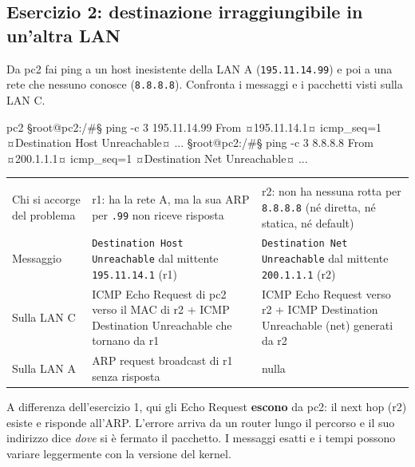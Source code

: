 \subsection{Esercizio 2: destinazione irraggiungibile in un'altra LAN}
\begin{esempio}[Consegna]
Da pc2 fai ping a un host inesistente della LAN A (\texttt{195.11.14.99}) e poi a una rete che nessuno conosce (\texttt{8.8.8.8}). Confronta i messaggi e i pacchetti visti sulla LAN C.
\end{esempio}
\begin{terminale}{pc2}
§root@pc2:/#§ ping -c 3 195.11.14.99
From ¤195.11.14.1¤ icmp_seq=1 ¤Destination Host Unreachable¤
...
§root@pc2:/#§ ping -c 3 8.8.8.8
From ¤200.1.1.1¤ icmp_seq=1 ¤Destination Net Unreachable¤
...
\end{terminale}
\begin{tecnica}[Soluzione]
\begin{center}
\begin{tabularx}{\linewidth}{l Y Y}
 &  & \\
Chi si accorge del problema & r1: ha la rete A, ma la sua ARP per \texttt{.99} non riceve risposta & r2: non ha nessuna rotta per \texttt{8.8.8.8} (né diretta, né statica, né default)\\
Messaggio & \texttt{Destination Host Unreachable} dal mittente \texttt{195.11.14.1} (r1) & \texttt{Destination Net Unreachable} dal mittente \texttt{200.1.1.1} (r2)\\
Sulla LAN C & ICMP Echo Request di pc2 verso il MAC di r2 + ICMP Destination Unreachable che tornano da r1 & ICMP Echo Request verso r2 + ICMP Destination Unreachable (net) generati da r2\\
Sulla LAN A & ARP request broadcast di r1 senza risposta & nulla\\
\end{tabularx}
\end{center}
A differenza dell'esercizio 1, qui gli Echo Request \textbf{escono} da pc2: il next hop (r2) esiste e risponde all'ARP. L'errore arriva da un router lungo il percorso e il suo indirizzo dice \emph{dove} si è fermato il pacchetto. I messaggi esatti e i tempi possono variare leggermente con la versione del kernel.
\end{tecnica}

